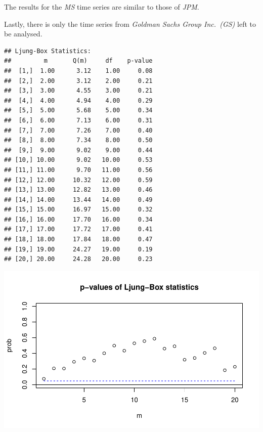 \documentclass[12pt,a4paper]{article}
\newenvironment{Shaded}{\begin{snugshade}}{\end{snugshade}}
\newcommand{\DataTypeTok}[1]{\textcolor[rgb]{0.13,0.29,0.53}{#1}}
\newcommand{\DecValTok}[1]{\textcolor[rgb]{0.00,0.00,0.81}{#1}}
\newcommand{\KeywordTok}[1]{\textcolor[rgb]{0.13,0.29,0.53}{\textbf{#1}}}
\newcommand{\NormalTok}[1]{#1}
\newcommand{\OperatorTok}[1]{\textcolor[rgb]{0.81,0.36,0.00}{\textbf{#1}}}
\begin{document}
The results for the \emph{MS} time series are similar to those of
\emph{JPM}.

Lastly, there is only the time series from \emph{Goldman Sachs Group
Inc.~(GS)} left to be analysed.

\begin{Shaded}
\end{Shaded}

\begin{verbatim}
## Ljung-Box Statistics:  
##         m       Q(m)     df    p-value
##  [1,]  1.00      3.12    1.00     0.08
##  [2,]  2.00      3.12    2.00     0.21
##  [3,]  3.00      4.55    3.00     0.21
##  [4,]  4.00      4.94    4.00     0.29
##  [5,]  5.00      5.68    5.00     0.34
##  [6,]  6.00      7.13    6.00     0.31
##  [7,]  7.00      7.26    7.00     0.40
##  [8,]  8.00      7.34    8.00     0.50
##  [9,]  9.00      9.02    9.00     0.44
## [10,] 10.00      9.02   10.00     0.53
## [11,] 11.00      9.70   11.00     0.56
## [12,] 12.00     10.32   12.00     0.59
## [13,] 13.00     12.82   13.00     0.46
## [14,] 14.00     13.44   14.00     0.49
## [15,] 15.00     16.97   15.00     0.32
## [16,] 16.00     17.70   16.00     0.34
## [17,] 17.00     17.72   17.00     0.41
## [18,] 18.00     17.84   18.00     0.47
## [19,] 19.00     24.27   19.00     0.19
## [20,] 20.00     24.28   20.00     0.23
\end{verbatim}

\includegraphics{solution_exercise_1_files/figure-latex/unnamed-chunk-5-1.pdf}
\end{document}
